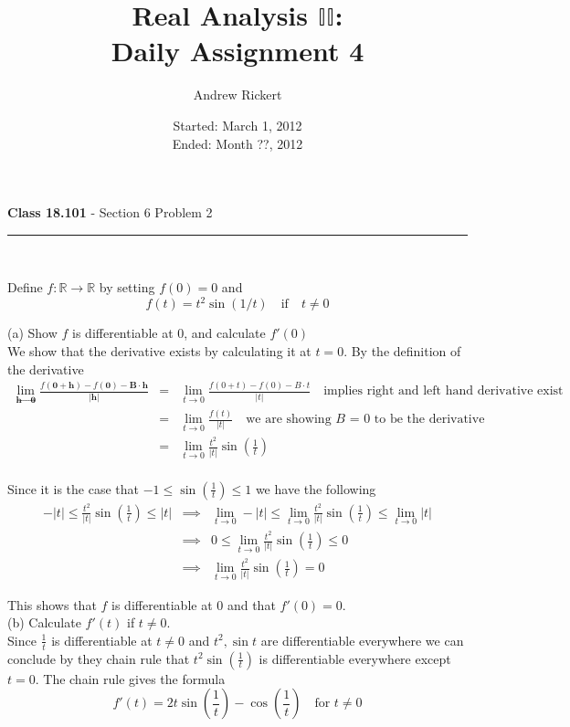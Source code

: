 \documentclass[11pt,reqno]{article}
\title{Real Analysis $\mathbb{II}$: \\ Daily Assignment 4}
\author{Andrew Rickert}
\date{Started: March 1, 2012 \\ \hspace{1pt} Ended: Month ??,  2012}                                           %
\begin{document}
\maketitle

\begin{flushleft} 
\textbf{Class 18.101} - Section 6 Problem 2\\
\rule{500pt}{1pt}\\
\end{flushleft} 

\noindent Define $f: \mathbb{R} \to \mathbb{R}$ by setting $f(0) = 0$ and
\[ f(t) = t^2 \sin(1/t) \quad \text{if} \quad t \neq 0 \]

\noindent (a) Show $f$ is differentiable at $0$, and calculate $f'(0)$\\

We show that the derivative exists by calculating it at $t = 0$. By the definition of the derivative
\begin{eqnarray*}
\lim_{\textbf{h} \to \textbf{0}} \frac{f(\textbf{0} + \textbf{h}) - f(\textbf{0}) - \textbf{B}\cdot \textbf{h}}{|\textbf{h}|} &=&  \lim_{t \to 0} \frac{f(0 + t) - f(0) - B \cdot t}{|t|} \quad \text{implies right and left hand derivative exist}\\
&=& \lim_{t \to 0} \frac{f(t)}{|t|} \quad \text{we are showing $B$ = 0 to be the derivative}\\
&=& \lim_{t \to 0} \frac{t^2}{|t|} \sin(\frac{1}{t})\\
\end{eqnarray*}

\noindent Since it is the case that $-1 \le \sin(\frac{1}{t}) \le 1$ we have the following
\begin{eqnarray*}
-|t| \le \frac{t^2}{|t|} \sin(\frac{1}{t}) \le |t| &\implies& \lim_{t \to 0} -|t| \le \lim_{t \to 0} \frac{t^2}{|t|} \sin(\frac{1}{t}) \le \lim_{t \to 0} |t| \\
& \implies & 0 \le \lim_{t \to 0} \frac{t^2}{|t|} \sin(\frac{1}{t}) \le 0 \\
& \implies & \lim_{t \to 0} \frac{t^2}{|t|} \sin(\frac{1}{t}) = 0
\end{eqnarray*}

\noindent This shows that $f$ is differentiable at 0 and that $f'(0) = 0$.\\

\noindent (b) Calculate $f'(t)$ if $t \neq 0$.\\

Since $\frac{1}{t}$ is differentiable at $t \neq 0$ and $t^2, \sin t$ are differentiable everywhere we can conclude by they chain rule that $t^2 \sin (\frac{1}{t} )$ is differentiable everywhere except $t = 0$. The chain rule gives the formula
\[ f'(t) = 2t \sin( \frac{1}{t} ) - \cos(\frac{1}{t}) \quad \text{for $t \neq 0$}\]
\end{document}
